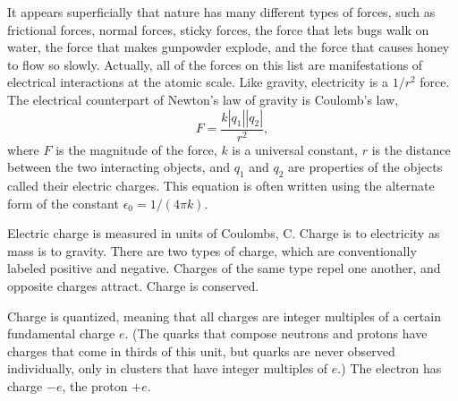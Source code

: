 It appears superficially that nature has many different types of forces, such
as frictional forces, normal forces, sticky forces, the force that lets bugs
walk on water, the force that makes gunpowder explode,
and the force that causes honey to flow so slowly. 
Actually, all of the forces on this list are manifestations of electrical
interactions at the atomic scale. Like gravity, electricity is a $1/r^2$ force.
The electrical counterpart of Newton's law of gravity is Coulomb's law,
\begin{equation}
  F = \frac{k|q_1||q_2|}{r^2},
\end{equation}
where $F$ is the magnitude of the force, $k$ is a universal constant, $r$ is
the distance between the two interacting objects, and $q_1$ and $q_2$ are properties
of the objects called their electric charges. This equation is often written using
the alternate form of the constant $\epsilon_0=1/(4\pi k)$.

Electric charge is measured in units
of Coulombs, C. Charge is to electricity as mass is to gravity. There are two
types of charge, which are conventionally labeled positive and negative.
Charges of the same type repel one another, and opposite charges attract.
Charge is conserved.

Charge is quantized, meaning that all charges are integer multiples of a certain
fundamental charge $e$. (The quarks that compose neutrons and protons have charges
that come in thirds of this unit, but quarks are never observed individually, only
in clusters that have integer multiples of $e$.) The electron has charge $-e$, the
proton $+e$.
